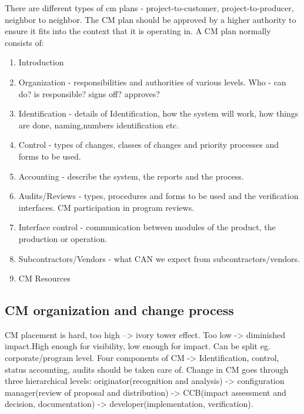 There are different types of cm plans - project-to-customer, project-to-producer, neighbor to neighbor. The CM plan should be approved by a higher authority to ensure it fits into the context that
it is operating in. 
A CM plan normally consists of:
\begin{enumerate}
    \item Introduction
    \item Organization - responsibilities and authorities of various levels. Who - can do? is responsible? signs off? approves?
    \item Identification - details of Identification, how the system will work, how things are done, naming,numbers identification etc.
    \item Control - types of changes, classes of changes and priority processes and forms to be used.
    \item Accounting - describe the system, the reports and the process.
    \item Audits/Reviews - types, procedures and forms to be used and the verification interfaces. CM participation in program reviews.
    \item Interface control - communication between modules of the product, the production or operation.
    \item Subcontractors/Vendors - what CAN we expect from subcontractors/vendors.
    \item CM Resources
\end{enumerate}

\subsection{CM organization and change process}
CM placement is hard, too high --> ivory tower effect. Too low -> diminished impact.High enough for visibility, low enough for impact. Can be split eg. corporate/program level.
Four components of CM -> Identification, control, status accounting, audits should be taken care of.
Change in CM goes through three hierarchical levels: originator(recognition and analysis) ->  configuration manager(review of proposal and distribution)
-> CCB(impact assessment and decision, documentation) -> developer(implementation, verification).
